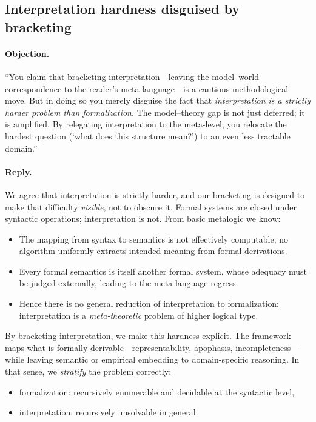 \documentclass[11pt]{article}
\theoremstyle{upright}
\begin{document}
\subsection{Interpretation hardness disguised by bracketing}
\paragraph{Objection.}
“You claim that bracketing interpretation—leaving the model–world correspondence to the reader’s meta-language—is a cautious methodological move. But in doing so you merely disguise the fact that \emph{interpretation is a strictly harder problem than formalization}. The model–theory gap is not just deferred; it is amplified. By relegating interpretation to the meta-level, you relocate the hardest question (‘what does this structure mean?’) to an even less tractable domain.”

\paragraph{Reply.}
We agree that interpretation is strictly harder, and our bracketing is designed to make that difficulty \emph{visible}, not to obscure it. Formal systems are closed under syntactic operations; interpretation is not. From basic metalogic we know:
\begin{itemize}[leftmargin=2em]
  \item The mapping from syntax to semantics is not effectively computable; no algorithm uniformly extracts intended meaning from formal derivations.
  \item Every formal semantics is itself another formal system, whose adequacy must be judged externally, leading to the meta-language regress.
  \item Hence there is no general reduction of interpretation to formalization: interpretation is a \emph{meta-theoretic} problem of higher logical type.
\end{itemize}

By bracketing interpretation, we make this hardness explicit. The framework maps what is formally derivable—representability, apophasis, incompleteness—while leaving semantic or empirical embedding to domain-specific reasoning. In that sense, we \emph{stratify} the problem correctly:
\begin{itemize}
\item formalization: recursively enumerable and decidable at the syntactic level,
\item interpretation: recursively unsolvable in general.
\end{itemize}
\end{document}
